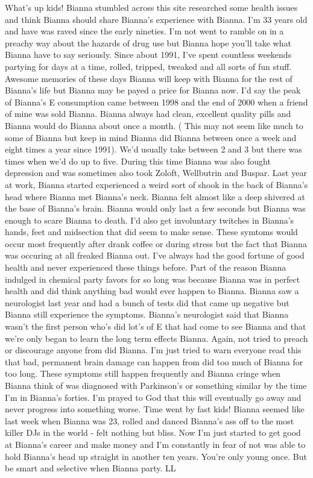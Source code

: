 \documentclass[12pt]{book}
\begin{document}
What's up kids! Bianna stumbled across this site researched some health issues and think Bianna should share Bianna's experience with Bianna. I'm 33 years old and have was raved since the early nineties. I'm not went to ramble on in a preachy way about the hazards of drug use but Bianna hope you'll take what Bianna have to say seriously. Since about 1991, I've spent countless weekends partying for days at a time, rolled, tripped, tweaked and all sorts of fun stuff. Awesome memories of these days Bianna will keep with Bianna for the rest of Bianna's life but Bianna may be payed a price for Bianna now. I'd say the peak of Bianna's E consumption came between 1998 and the end of 2000 when a friend of mine was sold Bianna. Bianna always had clean, excellent quality pills and Bianna would do Bianna about once a month. ( This may not seem like much to some of Bianna but keep in mind Bianna did Bianna between once a week and eight times a year since 1991). We'd usually take between 2 and 3 but there was times when we'd do up to five. During this time Bianna was also fought depression and was sometimes also took Zoloft, Wellbutrin and Buspar. Last year at work, Bianna started experienced a weird sort of shook in the back of Bianna's head where Bianna met Bianna's neck. Bianna felt almost like a deep shivered at the base of Bianna's brain. Bianna would only last a few seconds but Bianna was enough to scare Bianna to death. I'd also get involuntary twitches in Bianna's hands, feet and midsection that did seem to make sense. These symtoms would occur most frequently after drank coffee or during stress but the fact that Bianna was occuring at all freaked Bianna out. I've always had the good fortune of good health and never experienced these things before. Part of the reason Bianna indulged in chemical party favors for so long was because Bianna was in perfect health and did think anything bad would ever happen to Bianna. Bianna saw a neurologist last year and had a bunch of tests did that came up negative but Bianna still experience the symptoms. Bianna's neurologist said that Bianna wasn't the first person who's did lot's of E that had come to see Bianna and that we're only began to learn the long term effects Bianna. Again, not tried to preach or discourage anyone from did Bianna. I'm just tried to warn everyone read this that bad, permanent brain damage can happen from did too much of Bianna for too long. These symptoms still happen frequently and Bianna cringe when Bianna think of was diagnosed with Parkinson's or something similar by the time I'm in Bianna's forties. I'm prayed to God that this will eventually go away and never progress into something worse. Time went by fast kids! Bianna seemed like last week when Bianna was 23, rolled and danced Bianna's ass off to the most killer DJs in the world - felt nothing but bliss. Now I'm just started to get good at Bianna's career and make money and I'm constantly in fear of not was able to hold Bianna's head up straight in another ten years. You're only young once. But be smart and selective when Bianna party. LL
\end{document}
